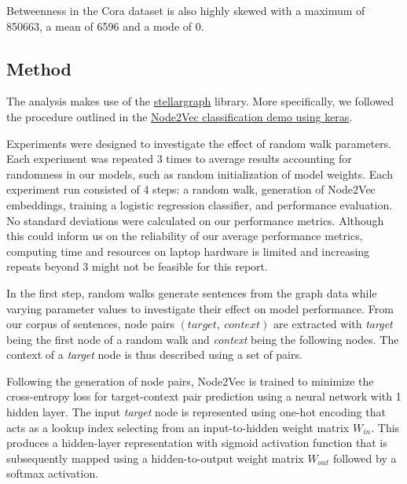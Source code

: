 \documentclass[a4paper,10pt]{article}
\begin{document}
Betweenness in the Cora dataset is also highly skewed with a maximum of 850663, a mean of 6596 and a mode of 0.



\subsection{Method}

The analysis makes use of the \href{https://stellargraph.readthedocs.io}{stellargraph} library. More specifically, we followed the procedure outlined in the \href{https://stellargraph.readthedocs.io/en/stable/demos/node-classification/keras-node2vec-node-classification.html}{Node2Vec classification demo using keras}.

Experiments were designed to investigate the effect of random walk parameters. Each experiment was repeated 3 times to average results accounting for randomness in our models, such as random initialization of model weights. Each experiment run consisted of 4 steps: a random walk, generation of Node2Vec embeddings, training a logistic regression classifier, and performance evaluation. No standard deviations were calculated on our performance metrics. Although this could inform us on the reliability of our average performance metrics, computing time and resources on laptop hardware is limited and increasing repeats beyond 3 might not be feasible for this report.

In the first step, random walks generate sentences from the graph data while varying parameter values to investigate their effect on model performance. From our corpus of sentences, node pairs $(target, \ context)$ are extracted with \textit{target} being the first node of a random walk and \textit{context} being the following nodes. The context of a \textit{target} node is thus described using a set of pairs.

Following the generation of node pairs, Node2Vec is trained to minimize the cross-entropy loss for target-context pair prediction using a neural network with 1 hidden layer. The input \textit{target} node is represented using one-hot encoding that acts as a lookup index selecting from an input-to-hidden weight matrix $W_{in}$. This produces a hidden-layer representation with sigmoid activation function that is subsequently mapped using a hidden-to-output weight matrix $W_{out}$ followed by a softmax activation.
\end{document}
